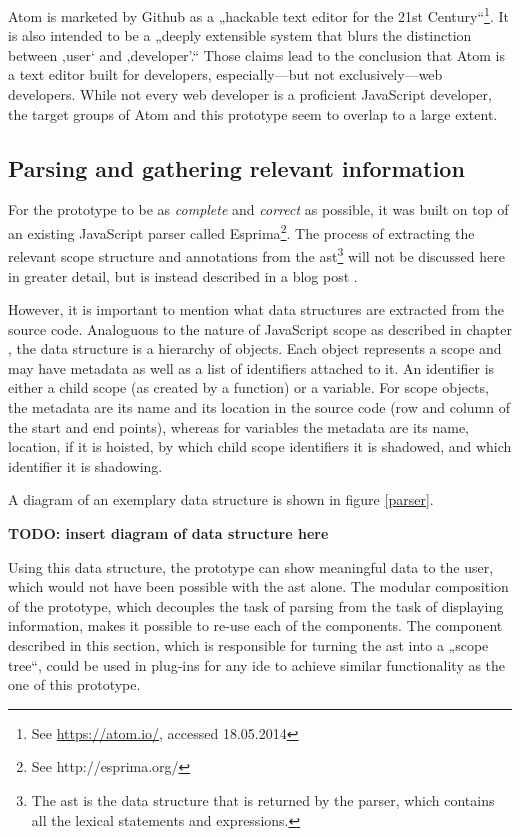 Atom is marketed by Github as a „hackable text editor for the 21st
Century“\footnote{See \url{https://atom.io/}, accessed 18.05.2014}. It
is also intended to be a „deeply extensible system that blurs the
distinction between ‚user‘ and ‚developer’.“ Those claims lead to the
conclusion that Atom is a text editor built for developers,
especially—but not exclusively—web developers. While not every web
developer is a proficient JavaScript developer, the target groups of
Atom and this prototype seem to overlap to a large extent.

\subsection{Parsing and gathering relevant
information}\label{parsing-and-gathering-relevant-information}

For the prototype to be as \emph{complete} and \emph{correct} as
possible, it was built on top of an existing JavaScript parser called
Esprima\footnote{See http://esprima.org/}. The process of extracting the
relevant scope structure and annotations from the
\ac{ast}\footnote{The \ac{ast} is the data structure that is returned by the parser, which contains all the lexical statements and expressions.}
will not be discussed here in greater detail, but is instead described
in a blog post \cite{tvo}.

However, it is important to mention what data structures are extracted
from the source code. Analoguous to the nature of JavaScript scope as
described in chapter , the data structure is a
hierarchy of objects. Each object represents a scope and may have
metadata as well as a list of identifiers attached to it. An identifier
is either a child scope (as created by a function) or a variable. For
scope objects, the metadata are its name and its location in the source
code (row and column of the start and end points), whereas for variables
the metadata are its name, location, if it is hoisted, by which child
scope identifiers it is shadowed, and which identifier it is shadowing.

A diagram of an exemplary data structure is shown in figure
\ref{parser}.

\textbf{TODO: insert diagram of data structure here}

Using this data structure, the prototype can show meaningful data to the
user, which would not have been possible with the \ac{ast} alone. The
modular composition of the prototype, which decouples the task of
parsing from the task of displaying information, makes it possible to
re-use each of the components. The component described in this section,
which is responsible for turning the \ac{ast} into a „scope tree“, could
be used in plug-ins for any \ac{ide} to achieve similar functionality as
the one of this prototype.

